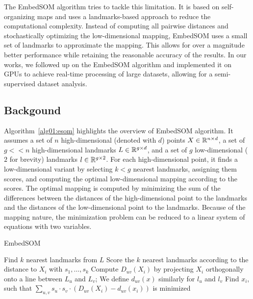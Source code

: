 The EmbedSOM algorithm tries to tackle this limitation. It is based on self-organizing maps and uses a landmarks-based approach to reduce the computational complexity. Instead of computing all pairwise distances and stochastically optimizing the low-dimensional mapping, EmbedSOM uses a small set of landmarks to approximate the mapping. This allows for over a magnitude better performance while retaining the reasonable accuracy of the results. In our works, we followed up on the EmbedSOM algorithm and implemented it on GPUs to achieve real-time processing of large datasets, allowing for a semi-supervised dataset analysis.

\subsection{Backgound}

Algorithm~\ref{alg01:esom} highlights the overview of EmbedSOM algorithm. It assumes a set of $n$ high-dimensional (denoted with $d$) points $X \in \mathbb{R}^{n \times d}$, a set of $g << n$ high-dimensional landmarks $L \in \mathbb{R}^{g \times d}$, and a set of $g$ low-dimensional ($2$ for brevity) landmarks $l \in \mathbb{R}^{g \times 2}$. For each high-dimensional point, it finds a low-dimensional variant by selecting $k < g$ nearest landmarks, assigning them scores, and computing the optimal low-dimensional mapping according to the scores. The optimal mapping is computed by minimizing the sum of the differences between the distances of the high-dimensional point to the landmarks and the distances of the low-dimensional point to the landmarks. Because of the mapping nature, the minimization problem can be reduced to a linear system of equations with two variables.

\begin{algorithm}[t]
    \caption{EmbedSOM}
    \label{alg01:esom}
    \begin{algorithmic}[1]
         
            \State Find $k$ nearest landmarks from $L$
            \State Score the $k$ nearest landmarks according to the distance to $X_i$ with $s_1, \dots, s_k$
             
                \State Compute $D_{uv}(X_i)$ by projecting $X_i$ orthogonally onto a line between $L_u$ and $L_v$; We define $d_{uv}(x)$ similarly for $l_u$ and $l_v$
            \EndFor
            \State Find $x_i$, such that $\sum_{u, v} s_u \cdot s_v \cdot (D_{uv}(X_i) - d_{uv}(x_i))$ is minimized
        \EndFor
        \EndProcedure
    \end{algorithmic}
\end{algorithm}

